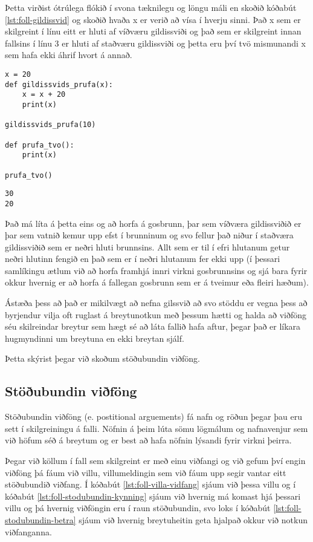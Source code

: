 Þetta virðist ótrúlega flókið í svona tæknilegu og löngu máli en skoðið kóðabút \ref{lst:foll-gildissvid} og skoðið hvaða x er verið að vísa í hverju sinni.
Það x sem er skilgreint í línu eitt er hluti af víðværu gildissviði og það sem er skilgreint innan fallsins í línu 3 er hluti af staðværu gildissviði og þetta eru því tvö mismunandi x sem hafa ekki áhrif hvort á annað.

\begin{lstlisting}[caption=Gildissvið, label=lst:foll-gildissvid]
x = 20
def gildissvids_prufa(x):
	x = x + 20
	print(x)

gildissvids_prufa(10)

def prufa_tvo():
	print(x)

prufa_tvo()
\end{lstlisting}
\lstset{style=uttak}
\begin{lstlisting}
30
20
\end{lstlisting}
\lstset{style=venjulegt}

Það má líta á þetta eins og að horfa á gosbrunn, þar sem víðværa gildissviðið er þar sem vatnið kemur upp efst í brunninum og svo fellur það niður í staðværa gildissviðið sem er neðri hluti brunnsins.
Allt sem er til í efri hlutanum getur neðri hlutinn fengið en það sem er í neðri hlutanum fer ekki upp (í þessari samlíkingu ætlum við að horfa framhjá innri virkni gosbrunnsins og sjá bara fyrir okkur hvernig er að horfa á fallegan gosbrunn sem er á tveimur eða fleiri hæðum).

Ástæða þess að það er mikilvægt að nefna gilssvið að svo stöddu er vegna þess að byrjendur vilja oft ruglast á breytunotkun með þessum hætti og halda að viðföng séu skilreindar breytur sem hægt sé að láta fallið hafa aftur, þegar það er líkara hugmyndinni um breytuna en ekki breytan sjálf.

Þetta skýrist þegar við skoðum stöðubundin viðföng.

\subsection{Stöðubundin viðföng}
Stöðubundin viðföng (e. postitional arguements) fá nafn og röðun þegar þau eru sett í skilgreiningu á falli.
Nöfnin á þeim lúta sömu lögmálum og nafnavenjur sem við höfum séð á breytum og er best að hafa nöfnin lýsandi fyrir virkni þeirra.

Þegar við köllum í fall sem skilgreint er með einu viðfangi og við gefum því engin viðföng þá fáum við villu, villumeldingin sem við fáum upp segir vantar eitt stöðubundið viðfang.
Í kóðabút \ref{lst:foll-villa-vidfang} sjáum við þessa villu og í kóðabút \ref{lst:foll-stodubundin-kynning} sjáum við hvernig má komast hjá þessari villu og þá hvernig viðföngin eru í raun stöðubundin, svo loks í kóðabút \ref{lst:foll-stodubundin-betra} sjáum við hvernig breytuheitin geta hjalpað okkur við notkun viðfanganna.

